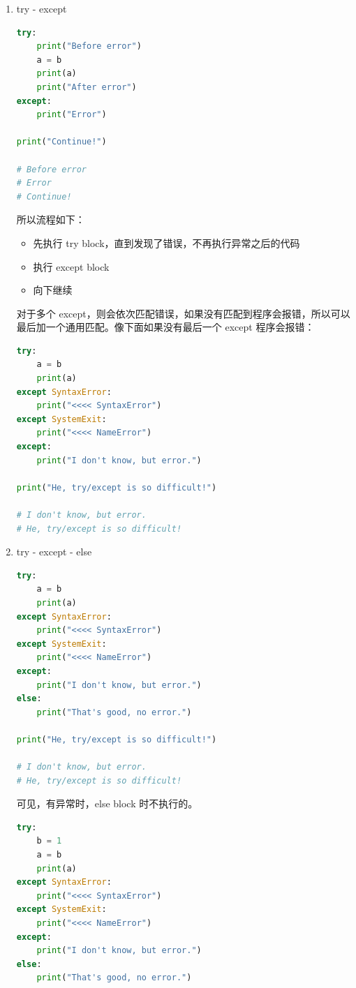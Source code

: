 \begin{enumerate}
\item try - except

\begin{lstlisting}[language=Python]
try:
	print("Before error")
	a = b
	print(a)
	print("After error")
except:
	print("Error")

print("Continue!")

# Before error
# Error
# Continue!
\end{lstlisting}

所以流程如下：

\begin{itemize}
\item 先执行 try block，直到发现了错误，不再执行异常之后的代码
\item 执行 except block
\item 向下继续
\end{itemize}

对于多个 except，则会依次匹配错误，如果没有匹配到程序会报错，所以可以最后加一个通用匹配。像下面如果没有最后一个 except 程序会报错：

\begin{lstlisting}[language=Python]
try:
	a = b
	print(a)
except SyntaxError:
	print("<<<< SyntaxError")
except SystemExit:
	print("<<<< NameError")
except:
	print("I don't know, but error.")

print("He, try/except is so difficult!")

# I don't know, but error.
# He, try/except is so difficult!
\end{lstlisting}

\item try - except - else

\begin{lstlisting}[language=Python]
try:
	a = b
	print(a)
except SyntaxError:
	print("<<<< SyntaxError")
except SystemExit:
	print("<<<< NameError")
except:
	print("I don't know, but error.")
else:
	print("That's good, no error.")

print("He, try/except is so difficult!")

# I don't know, but error.
# He, try/except is so difficult!
\end{lstlisting}

可见，有异常时，else block 时不执行的。

\begin{lstlisting}[language=Python]
try:
	b = 1
	a = b
	print(a)
except SyntaxError:
	print("<<<< SyntaxError")
except SystemExit:
	print("<<<< NameError")
except:
	print("I don't know, but error.")
else:
	print("That's good, no error.")


\end{lstlisting}
\end{enumerate}
